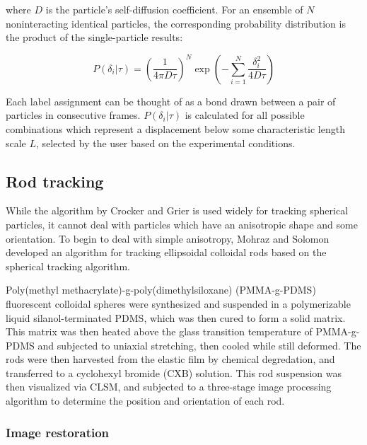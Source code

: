 where $D$ is the particle's self-diffusion coefficient.  For an ensemble of $N$ noninteracting
identical particles, the corresponding probability distribution is the product of the 
single-particle results:

\begin{center}\begin{equation}P({\delta_i}|\tau) = \left( \frac{1}{4\pi D\tau} \right)^N 
\exp{ \left( -\sum_{i=1}^N \frac{\delta_i^2}{4D\tau} \right) }
\end{equation}\end{center}

Each label assignment can be thought of as a bond drawn between a pair of particles
in consecutive frames.  $P({\delta_i}|\tau)$ is calculated for all possible combinations which
represent a displacement below some characteristic length scale $L$, selected by the user based on
the experimental conditions.

\subsection{Rod tracking}

While the algorithm by Crocker and Grier is used widely for tracking spherical particles, it 
cannot deal with particles which have an anisotropic shape and some orientation. 
To begin to deal with simple anisotropy, Mohraz and Solomon developed an algorithm for tracking 
ellipsoidal colloidal rods based on the spherical tracking algorithm.~\cite{rods-mohraz, solomon-dynamics}


Poly(methyl methacrylate)-g-poly(dimethylsiloxane) (PMMA-g-PDMS) fluorescent colloidal spheres were
synthesized and suspended in a polymerizable liquid silanol-terminated PDMS, which was then cured to form a solid 
matrix.  This matrix was then heated above the glass transition temperature 
of PMMA-g-PDMS and subjected to 
uniaxial stretching, then cooled while still deformed.  The rods were then harvested from the 
elastic film by chemical degredation, and transferred to a cyclohexyl bromide (CXB) solution.
This rod suspension was then visualized via CLSM, and 
subjected to a three-stage image processing algorithm to determine the position and orientation of each rod.

\subsubsection{Image restoration}

